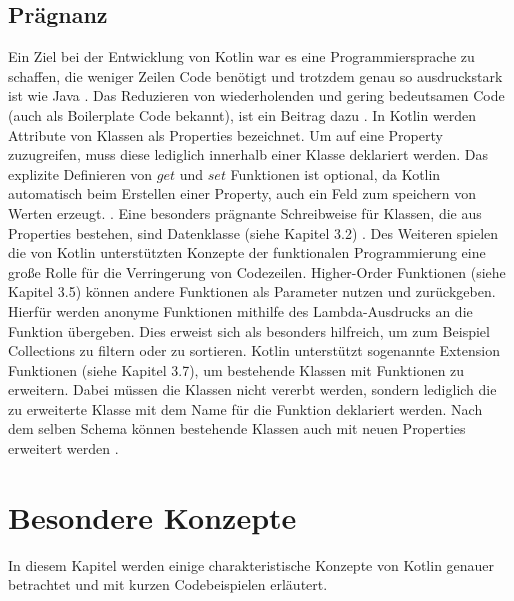 \documentclass{article}
\begin{document}
\subsection{Prägnanz}
Ein Ziel bei der Entwicklung von Kotlin war es eine Programmiersprache zu schaffen, die weniger Zeilen Code benötigt und trotzdem genau so ausdruckstark ist wie Java \cite{Kotlin_In-D}. Das Reduzieren von wiederholenden und gering bedeutsamen Code (auch als Boilerplate Code bekannt), ist ein Beitrag dazu \cite{KotlinLangDoc}. In Kotlin werden Attribute von Klassen als Properties bezeichnet. Um auf eine Property zuzugreifen, muss diese lediglich innerhalb einer Klasse deklariert werden. Das explizite Definieren von $get$ und $set$ Funktionen ist optional, da Kotlin automatisch beim Erstellen einer Property, auch ein Feld zum speichern von Werten erzeugt.  \cite{KotlinLangDoc}. Eine besonders prägnante Schreibweise für Klassen, die aus Properties bestehen, sind Datenklasse (siehe Kapitel 3.2) \cite{KotlinLangDoc}.
Des Weiteren spielen die von Kotlin unterstützten Konzepte der funktionalen Programmierung eine große Rolle für die Verringerung von Codezeilen. Higher-Order Funktionen (siehe Kapitel 3.5) können andere Funktionen als Parameter nutzen und zurückgeben\cite{KotlinLangDoc}. Hierfür werden anonyme Funktionen mithilfe des Lambda-Ausdrucks an die Funktion übergeben. Dies erweist sich als besonders hilfreich, um zum Beispiel Collections zu filtern oder zu sortieren. \newline
Kotlin unterstützt sogenannte Extension Funktionen (siehe Kapitel 3.7), um bestehende Klassen mit Funktionen zu erweitern. Dabei müssen die Klassen nicht vererbt werden, sondern lediglich die zu erweiterte Klasse mit dem Name für die Funktion deklariert werden. Nach dem selben Schema können bestehende Klassen auch mit neuen Properties erweitert werden \cite{KotlinLangDoc}.

\section{Besondere Konzepte}
In diesem Kapitel werden einige charakteristische Konzepte von Kotlin genauer betrachtet und mit kurzen Codebeispielen erläutert.
\end{document}
